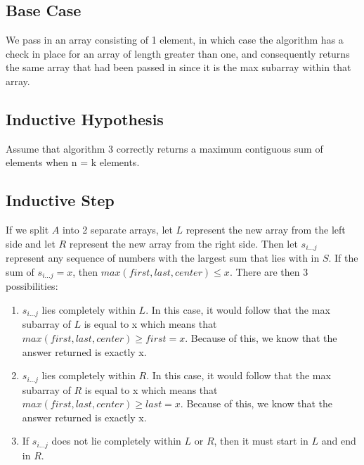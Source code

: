 \documentclass[11pt,letterpaper]{article}
\begin{document}
\subsection*{Base Case}
We pass in an array consisting of 1 element, in which case the algorithm has a check in place for an array of length greater than one, and consequently returns the same array that had been passed in since it is the max subarray within that array.

\subsection*{Inductive Hypothesis}
Assume that algorithm 3 correctly returns a maximum contiguous sum of elements when n = k elements. 

\subsection*{Inductive Step}
If we split $A$ into 2 separate arrays, let $L$ represent the new array from the left side and let $R$ represent the new array from the right side. Then let $s_{i...j}$ represent any sequence of numbers with the largest sum that lies with in $S$. If the sum of $s_{i...j} = x$, then $max(first, last, center) \leq x$. There are then 3 possibilities:
\begin{enumerate}
\item $s_{i...j}$ lies completely within $L$. In this case, it would follow that the max subarray of $L$ is equal to x which means that $max(first, last, center) \geq first = x$. Because of this, we know that the answer returned is exactly x.
\item $s_{i...j}$ lies completely within $R$. In this case, it would follow that the max subarray of $R$ is equal to x which means that $max(first, last, center) \geq last = x$. Because of this, we know that the answer returned is exactly x.
\item If $s_{i...j}$ does not lie completely within $L$ or $R$, then it must start in $L$ and end in $R$. 
\end{enumerate}
\end{document}
